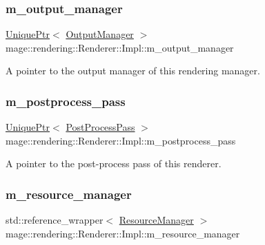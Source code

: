 \subsubsection{\texorpdfstring{m\+\_\+output\+\_\+manager}{m\_output\_manager}}
{\footnotesize\ttfamily \hyperlink{namespacemage_a3316d7143a973e37adf1110f2e80ca31}{Unique\+Ptr}$<$ \hyperlink{classmage_1_1rendering_1_1_output_manager}{Output\+Manager} $>$ mage\+::rendering\+::\+Renderer\+::\+Impl\+::m\+\_\+output\+\_\+manager\hspace{0.3cm}{\ttfamily [private]}}

A pointer to the output manager of this rendering manager. \hypertarget{classmage_1_1rendering_1_1_renderer_1_1_impl_a243257571f0f32cdc401b73d9b39587c}{}\label{classmage_1_1rendering_1_1_renderer_1_1_impl_a243257571f0f32cdc401b73d9b39587c} 
\subsubsection{\texorpdfstring{m\+\_\+postprocess\+\_\+pass}{m\_postprocess\_pass}}
{\footnotesize\ttfamily \hyperlink{namespacemage_a3316d7143a973e37adf1110f2e80ca31}{Unique\+Ptr}$<$ \hyperlink{classmage_1_1rendering_1_1_post_process_pass}{Post\+Process\+Pass} $>$ mage\+::rendering\+::\+Renderer\+::\+Impl\+::m\+\_\+postprocess\+\_\+pass\hspace{0.3cm}{\ttfamily [private]}}

A pointer to the post-\/process pass of this renderer. \hypertarget{classmage_1_1rendering_1_1_renderer_1_1_impl_a4e128f17ff567e4af890c730c6357c94}{}\label{classmage_1_1rendering_1_1_renderer_1_1_impl_a4e128f17ff567e4af890c730c6357c94} 
\subsubsection{\texorpdfstring{m\+\_\+resource\+\_\+manager}{m\_resource\_manager}}
{\footnotesize\ttfamily std\+::reference\+\_\+wrapper$<$ \hyperlink{classmage_1_1rendering_1_1_resource_manager}{Resource\+Manager} $>$ mage\+::rendering\+::\+Renderer\+::\+Impl\+::m\+\_\+resource\+\_\+manager\hspace{0.3cm}{\ttfamily [private]}}

